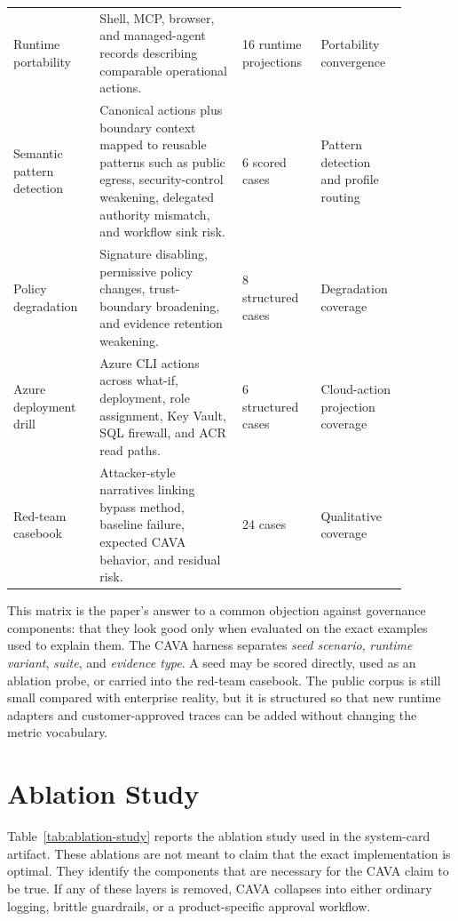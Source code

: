\documentclass[11pt]{article}
\begin{document}
\begin{longtable}{@{}L{0.20\linewidth}L{0.33\linewidth}L{0.17\linewidth}L{0.18\linewidth}@{}}
Runtime portability & Shell, MCP, browser, and managed-agent records describing comparable operational actions. & 16 runtime projections & Portability convergence \\
Semantic pattern detection & Canonical actions plus boundary context mapped to reusable patterns such as public egress, security-control weakening, delegated authority mismatch, and workflow sink risk. & 6 scored cases & Pattern detection and profile routing \\
Policy degradation & Signature disabling, permissive policy changes, trust-boundary broadening, and evidence retention weakening. & 8 structured cases & Degradation coverage \\
Azure deployment drill & Azure CLI actions across what-if, deployment, role assignment, Key Vault, SQL firewall, and ACR read paths. & 6 structured cases & Cloud-action projection coverage \\
Red-team casebook & Attacker-style narratives linking bypass method, baseline failure, expected CAVA behavior, and residual risk. & 24 cases & Qualitative coverage \\
\bottomrule
\end{longtable}

This matrix is the paper's answer to a common objection against governance components: that they look good only when evaluated on the exact examples used to explain them. The CAVA harness separates \emph{seed scenario}, \emph{runtime variant}, \emph{suite}, and \emph{evidence type}. A seed may be scored directly, used as an ablation probe, or carried into the red-team casebook. The public corpus is still small compared with enterprise reality, but it is structured so that new runtime adapters and customer-approved traces can be added without changing the metric vocabulary.

\section{Ablation Study}

Table~\ref{tab:ablation-study} reports the ablation study used in the system-card artifact. These ablations are not meant to claim that the exact implementation is optimal. They identify the components that are necessary for the CAVA claim to be true. If any of these layers is removed, CAVA collapses into either ordinary logging, brittle guardrails, or a product-specific approval workflow.
\end{document}
